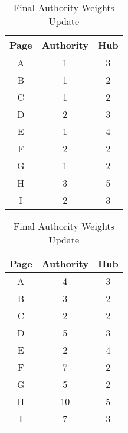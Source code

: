 \documentclass[12pt,english]{article}
\begin{document}
\begin{table}[!htb]
    \begin{minipage}{.5\linewidth}
      \centering
        \begin{tabular}{|c|c|c|}
			\hline
			Page & Authority & Hub \\
			\hline
			A & 1 & 3 \\ 
			B & 1 & 2 \\
			C & 1 & 2 \\ 
			D & 2 & 3 \\
			E & 1 & 4 \\ 
			F & 2 & 2 \\
			G & 1 & 2 \\ 
			H & 3 & 5 \\
			I & 2 & 3 \\
			\hline
        \end{tabular}
      \caption{Updating Hub Weights}
    \end{minipage}%
    \begin{minipage}{.5\linewidth}
      \centering
        \begin{tabular}{|c|c|c|}
			\hline
			Page & Authority & Hub \\
			\hline
			A & 4 & 3 \\ 
			B & 3 & 2 \\
			C & 2 & 2 \\ 
			D & 5 & 3 \\
			E & 2 & 4 \\ 
			F & 7 & 2 \\
			G & 5 & 2 \\ 
			H & 10 & 5 \\
			I & 7 & 3 \\
			\hline
        \end{tabular}
        \caption{Final Authority Weights Update}
    \end{minipage} 
\end{table}
\end{document}
